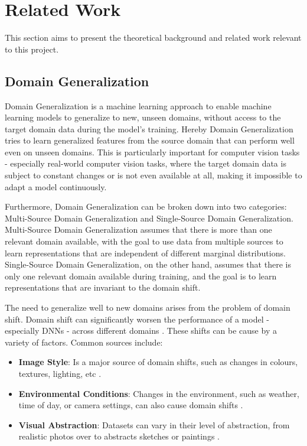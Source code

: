 \section{Related Work}
This section aims to present the theoretical background and related work relevant to this project.

\subsection{Domain Generalization}

Domain Generalization is a machine learning approach to enable machine learning models to generalize to new, unseen domains, without access to the target domain data during the model's training. Hereby Domain Generalization tries to learn generalized features from the source domain that can perform well even on unseen domains. This is particularly important for computer vision tasks - especially real-world computer vision tasks, where the target domain data is subject to constant changes or is not even available at all, making it impossible to adapt a model continuously. \cite{liDeeperBroaderArtier2017,liuDEJAVUContinual2023,blanchardGeneralizingSeveralRelated2011}


Furthermore, Domain Generalization can be broken down into two categories: Multi-Source Domain Generalization and Single-Source Domain Generalization.
Multi-Source Domain Generalization assumes that there is more than one relevant domain available, with the goal to use data from multiple sources to learn representations that are independent of different marginal distributions. \cite{blanchardGeneralizingSeveralRelated2011}
Single-Source Domain Generalization, on the other hand, assumes that there is only one relevant domain available during training, and the goal is to learn representations that are invariant to the domain shift.

The need to generalize well to new domains arises from the problem of domain shift. Domain shift can significantly worsen the performance of a model - especially DNNs - across different domains \cite{muandetDomainGeneralizationInvariant2013}. These shifts can be cause by a variety of factors. Common sources include:
\begin{itemize}
    \item \textbf{Image Style}: Is a major source of domain shifts, such as changes in colours, textures, lighting, etc \cite{zhouMixStyleNeuralNetworks2023}.
    \item \textbf{Environmental Conditions}: Changes in the environment, such as weather, time of day, or camera settings, can also cause domain shifts \cite{schwonbergAugmentationbasedDomainGeneralization2023}.
    \item \textbf{Visual Abstraction}: Datasets can vary in their level of abstraction, from realistic photos over to abstracts sketches or paintings \cite{liDeeperBroaderArtier2017}.
\end{itemize}



